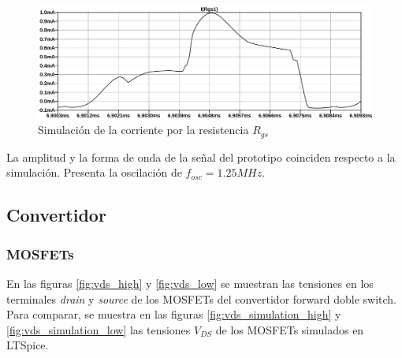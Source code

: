 \begin{figure}[H]
    \centering
    \includegraphics[width=\textwidth]{images/sim/7.pdf}
    \caption{Simulación de la corriente por la resistencia $R_{gs}$}
    \label{fig:sim:7}
\end{figure}

La amplitud y la forma de onda de la señal del prototipo coinciden respecto a la simulación. 
Presenta la oscilación de $f_{osc}=1.25MHz$. 











\subsection{Convertidor}

\subsubsection{MOSFETs}



En las figuras \ref{fig:vds_high} y \ref{fig:vds_low} se muestran las tensiones en los terminales \textit{drain} y \textit{source} de los MOSFETs del convertidor forward doble switch.
Para comparar, se muestra en las figuras \ref{fig:vds_simulation_high} y \ref{fig:vds_simulation_low} las tensiones $V_{DS}$ de los MOSFETs simulados en LTSpice. 

